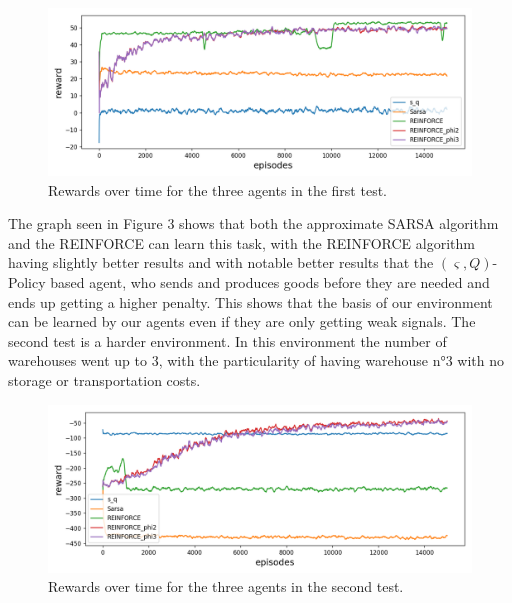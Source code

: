 \documentclass[journal, a4paper]{IEEEtran}
\theoremstyle{plain}
\theoremstyle{definition}
\begin{document}
\begin{figure}[h]
	\centering
	\includegraphics[width=\columnwidth]{medium_2_env_rewards.png}
	\caption{\label{medium_2_env_rewards} Rewards over time for the three agents in the first test.}
\end{figure}
\newline
The graph seen in Figure 3 shows that both the approximate SARSA algorithm and the REINFORCE can learn this task, with the REINFORCE algorithm having slightly better results and with notable better results that the $(\varsigma, Q)$-Policy based agent, who sends and produces goods before they are needed and ends up getting a higher penalty. This shows that the basis of our environment can be learned by our agents even if they are only getting weak signals.\newline
The second test is a harder environment. 
In this environment the number of warehouses went up to 3, with the particularity of having warehouse n°3 with no storage or transportation costs.
\begin{figure}[h]
	\centering
	\includegraphics[width=\columnwidth]{weird_2_env_rewards.png}
	\caption{\label{weird_2_env_rewards} Rewards over time for the three agents in the second test.}
\end{figure}
\end{document}
